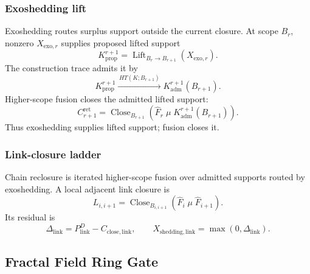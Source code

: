 \subsubsection{Exoshedding lift}\label{subsec:exoshedding-lift}
Exoshedding routes surplus support outside the current closure. At scope \(B_r\), nonzero \(X_{\mathrm{exo},r}\) supplies proposed lifted support
\begin{equation}
K^{r+1}_{\mathrm{prop}}
=
\operatorname{Lift}_{B_r\to B_{r+1}}
\left(X_{\mathrm{exo},r}\right).
\label{eq:exoshedding-lift}
\end{equation}
The construction trace admits it by
\begin{equation}
K^{r+1}_{\mathrm{prop}}
\xrightarrow{\,HT(K;B_{r+1})\,}
K^{r+1}_{\mathrm{adm}}(B_{r+1}).
\label{eq:lifted-support-admission}
\end{equation}
Higher-scope fusion closes the admitted lifted support:
\begin{equation}
C^{\mathrm{ret}}_{r+1}
=
\operatorname{Close}_{B_{r+1}}
\left(
\widehat F_r\;\mu\;K^{r+1}_{\mathrm{adm}}(B_{r+1})
\right).
\label{eq:higher-scope-fusion}
\end{equation}
Thus exoshedding supplies lifted support; fusion closes it.

\subsubsection{Link-closure ladder}\label{subsec:link-closure-ladder}
Chain reclosure is iterated higher-scope fusion over admitted supports routed by exoshedding. A local adjacent link closure is
\begin{equation}
L_{i,i+1}
=
\operatorname{Close}_{B_{i,i+1}}
\left(
\widehat F_i\;\mu\;\widehat F_{i+1}
\right).
\label{eq:link-closure-ladder}
\end{equation}
Its residual is
\begin{equation}
\Delta_{\mathrm{link}}=P^D_{\mathrm{link}}-C_{\mathrm{close,link}},
\qquad
X_{\mathrm{shedding},\mathrm{link}}=\max(0,\Delta_{\mathrm{link}}).
\label{eq:link-closure-residual}
\end{equation}



\subsection{Fractal Field Ring Gate}\label{subsec:fractal-field-ring-gate}

